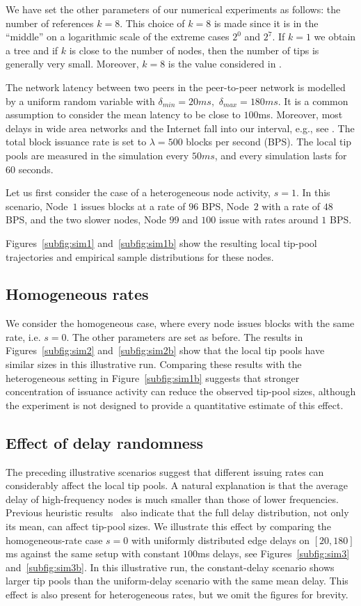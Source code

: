 \documentclass[a4paper,12pt,oneside,reqno]{amsart}
\newcommand{\1}{{\mathbf 1}}
\begin{document}
We have set the other parameters of our numerical experiments as follows: the number of references $k=8$.  This choice of $k=8$ is made since it is in the ``middle'' on a logarithmic scale of the extreme cases $2^0$ and $2^7$.  If $k=1$ we obtain a tree and if $k$ is close to the number of nodes, then the number of tips is generally very small. Moreover, $k=8$ is the value considered in \cite{robustnessIOTA2.0}.

The network latency between two peers in the peer-to-peer network is modelled by a uniform random variable with
$\delta_{min}=20ms,$ $\delta_{max}=180ms$. It is a common assumption to consider the mean latency to be close to $100$ms. Moreover, most delays in wide area networks and the Internet fall into our interval, e.g., see \cite{internetLatency}.
The total block issuance rate is set to $\lambda=500$ blocks per second (BPS). The local tip pools are measured in the simulation every $50ms$, and every simulation lasts for $60$ seconds.

Let us first consider the case of a heterogeneous node activity, $s=1$. In this scenario, Node~$1$ issues blocks at a rate of $96$ BPS, Node~$2$ with a rate of $48$ BPS, and the two slower nodes, Node $99$ and $100$ issue with rates around $1$ BPS.

Figures~\ref{subfig:sim1} and~\ref{subfig:sim1b} show the resulting local tip-pool trajectories and empirical sample distributions for these nodes.
\subsection{Homogeneous rates}
We consider the homogeneous case, where every node issues blocks with the same rate, i.e. $s=0$.  The other parameters are set as before. The results in Figures~\ref{subfig:sim2} and~\ref{subfig:sim2b} show that the local tip pools have similar sizes in this illustrative run. Comparing these results with the heterogeneous setting in Figure~\ref{subfig:sim1b} suggests that stronger concentration of issuance activity can reduce the observed tip-pool sizes, although the experiment is not designed to provide a quantitative estimate of this effect.

\subsection{Effect of delay randomness}
The preceding illustrative scenarios suggest that different issuing rates can considerably affect the local tip pools. A natural explanation is that the average delay of high-frequency nodes is much smaller than those of lower frequencies. Previous heuristic results~\cite{kumar2022effect} also indicate that the full delay distribution, not only its mean, can affect tip-pool sizes. We illustrate this effect by comparing the homogeneous-rate case $s=0$ with uniformly distributed edge delays on $[20,180]$ms against the same setup with constant $100$ms delays, see Figures~\ref{subfig:sim3} and~\ref{subfig:sim3b}. In this illustrative run, the constant-delay scenario shows larger tip pools than the uniform-delay scenario with the same mean delay. This effect is also present for heterogeneous rates, but we omit the figures for brevity.
\end{document}
